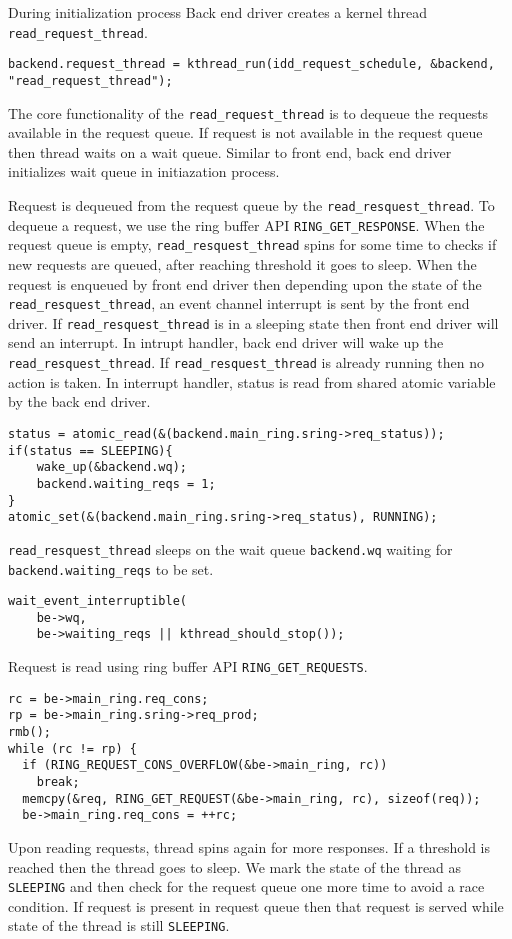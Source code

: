 During initialization process Back end driver creates a kernel thread \texttt{read\_request\_thread}.
\begin{verbatim}
backend.request_thread = kthread_run(idd_request_schedule, &backend, "read_request_thread");
\end{verbatim}

The core functionality of the \texttt{read\_request\_thread} is to dequeue the requests available in the request queue. If request is not available in the request queue then thread waits on a wait queue. Similar to front end, back end driver initializes wait queue in initiazation process. 

Request is dequeued from the request queue by the \texttt{read\_resquest\_thread}. To dequeue a request, we use the ring buffer API \texttt{RING\_GET\_RESPONSE}. When the request queue is empty, \texttt{read\_resquest\_thread} spins for some time to checks if new requests are queued, after reaching threshold it goes to sleep. When the request is enqueued by front end driver then depending upon the state of the \texttt{read\_resquest\_thread}, an event channel interrupt is sent by the front end driver. If \texttt{read\_resquest\_thread} is in a sleeping state then front end driver will send an interrupt. In intrupt handler, back end driver will wake up the \texttt{read\_resquest\_thread}. If \texttt{read\_resquest\_thread} is already running then no action is taken. In interrupt handler, status is read from shared atomic variable by the back end driver.

\begin{verbatim}
status = atomic_read(&(backend.main_ring.sring->req_status));
if(status == SLEEPING){
	wake_up(&backend.wq);
	backend.waiting_reqs = 1;
}
atomic_set(&(backend.main_ring.sring->req_status), RUNNING);
\end{verbatim}
\texttt{read\_resquest\_thread} sleeps on the wait queue \texttt{backend.wq} waiting for \texttt{backend.waiting\_reqs} to be set.
\begin{verbatim}
wait_event_interruptible(
	be->wq,
	be->waiting_reqs || kthread_should_stop());
\end{verbatim}
Request is read using ring buffer API \texttt{RING\_GET\_REQUESTS}.
\begin{verbatim}
rc = be->main_ring.req_cons;
rp = be->main_ring.sring->req_prod;
rmb();
while (rc != rp) {
  if (RING_REQUEST_CONS_OVERFLOW(&be->main_ring, rc))
    break;
  memcpy(&req, RING_GET_REQUEST(&be->main_ring, rc), sizeof(req));
  be->main_ring.req_cons = ++rc;
\end{verbatim}
Upon reading requests, thread spins again for more responses. If a threshold is reached then the thread goes to sleep. We mark the state of the thread as \texttt{SLEEPING} and then check for the request queue one more time to avoid a race condition. If request is present in request queue then that request is served while state of the thread is still \texttt{SLEEPING}.

